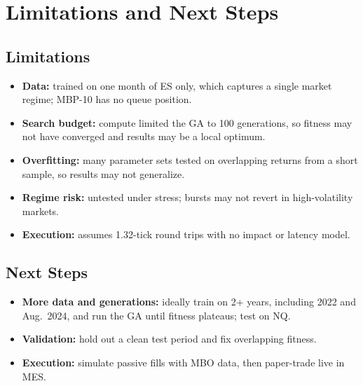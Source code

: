 \documentclass[11pt,letterpaper]{article}
\begin{document}
\section{Limitations and Next Steps}\label{sec:limits}
\subsection{Limitations}
\begin{itemize}\setlength{\itemsep}{0pt}\setlength{\parskip}{0pt}
    \item \textbf{Data:} trained on one month of ES only, which captures a single market regime; MBP-10 has no queue position.
    \item \textbf{Search budget:} compute limited the GA to 100 generations, so fitness may not have converged and results may be a local optimum.
    \item \textbf{Overfitting:} many parameter sets tested on overlapping returns from a short sample, so results may not generalize.
    \item \textbf{Regime risk:} untested under stress; bursts may not revert in high-volatility markets.
    \item \textbf{Execution:} assumes 1.32-tick round trips with no impact or latency model.
\end{itemize}

\subsection{Next Steps}
\begin{itemize}\setlength{\itemsep}{0pt}\setlength{\parskip}{0pt}
    \item \textbf{More data and generations:} ideally train on 2+ years, including 2022 and Aug.\ 2024, and run the GA until fitness plateaus; test on NQ.
    \item \textbf{Validation:} hold out a clean test period and fix overlapping fitness.
    \item \textbf{Execution:} simulate passive fills with MBO data, then paper-trade live in MES.
\end{itemize}
 
\appendix
\end{document}
